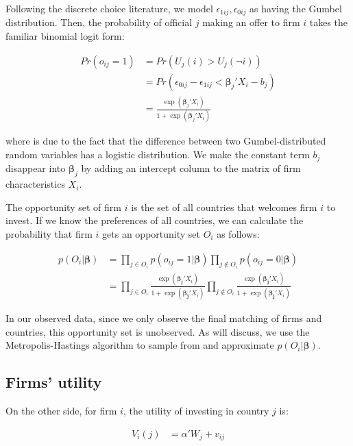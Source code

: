 Following the discrete choice literature, we model $\epsilon_{1ij}, \epsilon_{0ij}$ as having the Gumbel distribution. Then, the probability of official $j$ making an offer to firm $i$ takes the familiar binomial logit form:

\begin{align}
Pr(o_{ij} = 1) &= Pr(U_j(i) > U_j(\neg i)) \\
&= Pr(\epsilon_{0ij} - \epsilon_{1ij} <  \bm{\beta}_j ' X_i - b_j) \\
&= \frac{\exp({\bm{\beta}_j'X_i})}{1 + \exp({\bm{\beta}_j'X_i})} \label{eq:prob_offer_ij}
\end{align}

where  is due to the fact that the difference between two Gumbel-distributed random variables has a logistic distribution. We make the constant term $b_j$ disappear into $\bm{\beta}_j$ by adding an intercept column to the matrix of firm characteristics $X_i$.

The opportunity set of firm $i$ is the set of all countries that welcomes firm $i$ to invest. If we know the preferences of all countries, we can calculate the probability that firm $i$ gets an opportunity set $O_i$ as follows:

\begin{align}
p(O_i | \bm{\beta}) &= \prod_{j \in O_i} p(o_{ij} = 1 | \bm{\beta}) \prod_{j \notin O_i} p(o_{ij} = 0 | \bm{\beta}) \\
&= \prod_{j \in O_i} \frac{\exp(\bm{\beta_j} ' X_i)}{1 + \exp(\bm{\beta_j}' X_i)}
 \prod_{j \notin O_i} \frac{\exp(\bm{\beta_j} ' X_i)}{1 + \exp(\bm{\beta_j}' X_i)} \label{eq:conditional_probability_of_offer}
\end{align}

In our observed data, since we only observe the final matching of firms and countries, this opportunity set is unobserved. As  will discuss, we use the Metropolis-Hastings algorithm to sample from and approximate $p(O_i | \bm \beta)$.

\subsection{Firms' utility}

On the other side, for firm $i$, the utility of investing in country $j$ is:

\begin{align}
V_i(j) &= \alpha' W_{j} + v_{ij}
\end{align}

